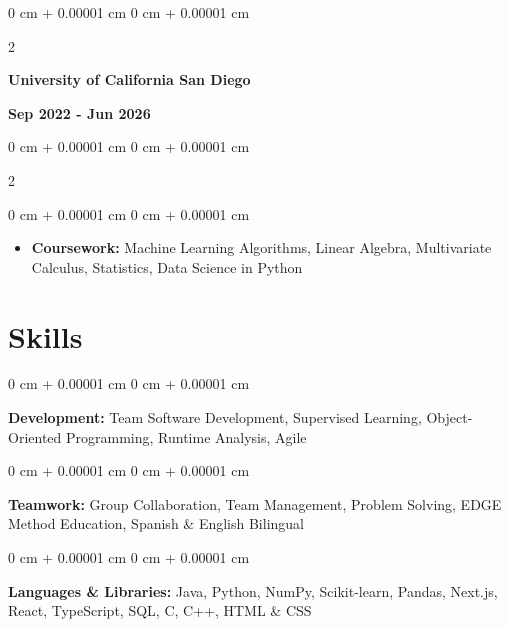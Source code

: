 \documentclass[10pt, letterpaper]{article}
\newenvironment{highlights}{
    \begin{itemize}[
        topsep=0.10 cm,
        parsep=0.10 cm,
        partopsep=0pt,
        itemsep=0pt,
        leftmargin=0 cm + 10pt
    ]
}{
    \end{itemize}
} %
\newenvironment{onecolentry}{
    \begin{adjustwidth}{
        0 cm + 0.00001 cm
    }{
        0 cm + 0.00001 cm
    }
}{
    \end{adjustwidth}
} %
\newenvironment{twocolentry}[2][]{
    \onecolentry%
    \def\secondColumn{#2}
    \setcolumnwidth{\fill, 7.0 cm}
    \begin{paracol}{2}
}{
    \switchcolumn\raggedleft\secondColumn%
    \end{paracol}
    \endonecolentry%
} %
\begin{document}
        \begin{twocolentry}
            {\color{secondaryColor}\textbf{Sep 2022 - Jun 2026}}
            \textbf{University of California San Diego}
        \end{twocolentry}

        
        \begin{twocolentry}
            {\text{}}
        \end{twocolentry}

        \begin{onecolentry}
            \begin{highlights}
                \item \textbf{Coursework:} Machine Learning Algorithms, Linear Algebra, Multivariate Calculus, Statistics, Data Science in Python
            \end{highlights}
        \end{onecolentry}
    
    {\color{secondaryColor}\section{Skills}}
        
        \begin{onecolentry}
            \textbf{Development:} Team Software Development, Supervised Learning, Object-Oriented Programming, Runtime Analysis, Agile
        \end{onecolentry}

        \vspace{0.10 cm}

        \begin{onecolentry}
            \textbf{Teamwork:} Group Collaboration, Team Management, Problem Solving, EDGE Method Education, Spanish \& English Bilingual
        \end{onecolentry}

        \vspace{0.10 cm}
        
        \begin{onecolentry}
            \textbf{Languages \& Libraries:} Java, Python, NumPy, Scikit-learn, Pandas, Next.js, React, TypeScript, SQL, C, C++, HTML \& CSS
        \end{onecolentry}
\end{document}
